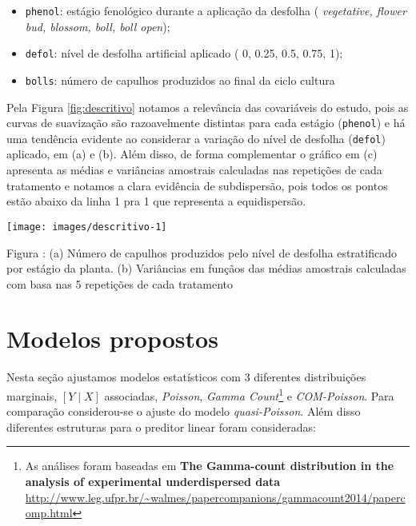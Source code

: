 \documentclass[nohyper, justified, svgnames]{tufte-handout}\usepackage[]{graphicx}\usepackage[]{color}
\makeatletter
\def\maxwidth{ %
  \ifdim\Gin@nat@width>\linewidth
    \linewidth
  \else
    \Gin@nat@width
  \fi
}
\newenvironment{knitrout}{}{} %
\makeatother
\begin{document}
\begin{itemize}
  \item \texttt{phenol}: estágio fenológico durante a aplicação da 
  desfolha (\textit{
  vegetative, flower bud, blossom, boll, boll open});
  \item \texttt{defol}: nível de desfolha artificial aplicado (
  0, 0.25, 0.5, 0.75, 1);
  \item \texttt{bolls}: número de capulhos produzidos ao final da ciclo
  cultura
\end{itemize}

Pela Figura \ref{fig:descritivo} notamos a relevância das covariáveis 
do estudo, pois as curvas de suavização são razoavelmente distintas para
cada estágio (\texttt{phenol}) e há uma tendência evidente ao considerar 
a variação do nível de desfolha (\texttt{defol}) aplicado, em (a) e (b).
Além disso, de forma complementar o gráfico em (c) apresenta as médias
e variâncias amostrais calculadas nas repetições de cada tratamento e 
notamos a clara evidência de subdispersão, pois todos os pontos estão 
abaixo da linha 1 pra 1 que representa a equidispersão.

\pagebreak

\begin{fullwidth}
\begin{knitrout}\scriptsize
{}\color{fgcolor}
\texttt{[image: images/descritivo-1]} 

\end{knitrout}

\smallskip\noindent\small Figura \thefigure:
(a) Número de capulhos produzidos pelo nível de desfolha estratificado 
por estágio da planta. (b) Variâncias em funçãos das médias amostrais 
calculadas com basa nas 5 repetições de cada tratamento
\end{fullwidth}

\section{Modelos propostos}

Nesta seção ajustamos modelos estatísticos com 3 diferentes distribuições marginais, $[Y \mid X]$ associadas, \textit{Poisson}, 
\textit{Gamma Count}\footnote{As análises foram baseadas em \textbf{The 
Gamma-count distribution in the analysis of experimental underdispersed
data} \\
\url{http://www.leg.ufpr.br/~walmes/papercompanions/gammacount2014/papercomp.html}}
e \textit{COM-Poisson}. Para comparação considerou-se o ajuste do modelo
\textit{quasi-Poisson}. Além disso diferentes estruturas para o preditor
linear foram consideradas:
\end{document}
